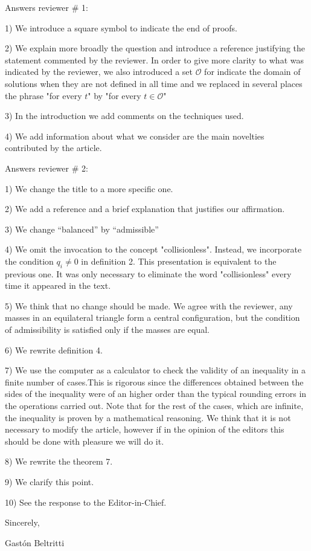 \documentclass{article}
\begin{document}
Answers  reviewer # 1:

1) We introduce a square symbol to indicate the end of proofs.

2) We explain more broadly the question and introduce a reference justifying the statement commented by the reviewer. In order to give more clarity to what was indicated by the reviewer, we also introduced a set $ \mathcal {O} $  for indicate the domain of solutions when they are not defined in all time  and we replaced in several places the phrase "for every $ t $" by "for every $ t \in \mathcal {O} $"

3) In the introduction we add comments on the techniques used.

4) We add information about what we consider are the main novelties contributed by the article.


Answers  reviewer # 2:

1) We change the title to a more specific one.

2) We add a reference and a brief explanation that justifies our affirmation.

3) We change ``balanced'' by ``admissible''

4) We omit the invocation to the concept  "collisionless". Instead, we incorporate the condition $q_i \neq 0$ in definition 2. This presentation is equivalent to the previous one. It was only necessary to eliminate the word "collisionless" every time it appeared in the text.

5) We think that no change should be made. We agree with the reviewer, any masses in an equilateral triangle form a central configuration, but the condition of admissibility is satisfied only if the masses are equal.

6) We rewrite definition 4.

7) We use the computer as a calculator to check the validity of an inequality in a finite number of cases.This is rigorous since the differences obtained between the sides of the inequality were  of an higher order than the typical rounding errors in the operations carried out. Note that for the rest of the cases, which are infinite, the inequality is proven by a mathematical reasoning. We think that it is not necessary to modify the article, however if in the opinion of the editors this should be done with pleasure we will do it.

8) We rewrite the theorem 7.

9) We clarify this point.

10) See the response to the Editor-in-Chief.



Sincerely,
\vspace{.5cm}

Gast\'on Beltritti
\end{document}

